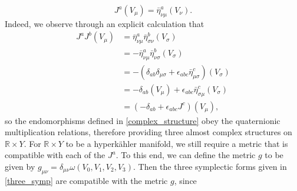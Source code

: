 \documentclass[a4paper,onecolumn,12pt]{article}
\theoremstyle{definition}
\theoremstyle{remark}
\begin{document}
\begin{equation}
\label{complex_structure}
	J^{a}(V_{\mu}) = \bar{\eta}^{a}_{\nu \mu}(V_{\nu}).
\end{equation}
Indeed, we observe through an explicit calculation that
\begin{align*} 
	J^{a}J^{b}(V_{\mu}) &= \bar{\eta}^{a}_{\nu \mu}\bar{\eta}^{b}_{\sigma\nu}(V_{\sigma})\\ 
	&= -\bar{\eta}^{a}_{\nu \mu}\bar{\eta}^{b}_{\nu\sigma}(V_{\sigma})\\
	&= -(\delta_{ab}\delta_{\mu\sigma} + \epsilon_{abc}\bar{\eta}^{c}_{\mu \sigma})(V_{\sigma})\\
	&= -\delta_{ab}(V_{\mu}) + \epsilon_{abc}\bar{\eta}^{c}_{\sigma\mu}(V_{\sigma})\\
	&= (-\delta_{ab} + \epsilon_{abc}J^{c})(V_{\mu}),
\end{align*}
so the endomorphisms defined in \eqref{complex_structure} obey the quaternionic multiplication relations, therefore providing three almost complex structures on $\mathbb{R}\times Y$. For $\mathbb{R}\times Y$ to be a hyperk{\"a}hler manifold, we still require a metric that is compatible with each of the $J^{a}$. To this end, we can define the metric $g$ to be given by $g_{\mu\nu} = \delta_{\mu\nu}\omega(V_{0},V_{1},V_{2},V_{3})$. Then  the three symplectic forms given in \ref{three_symp} are compatible with the metric $g$, since

\end{document}
